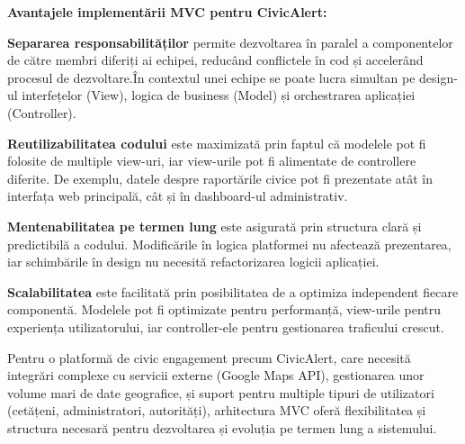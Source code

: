 \documentclass[12pt,a4paper]{report}
\begin{document}
\textbf{Avantajele implementării MVC pentru CivicAlert:}

\textbf{Separarea responsabilităților} permite dezvoltarea în paralel a componentelor de către membri diferiți ai echipei, reducând conflictele în cod și accelerând procesul de dezvoltare.În contextul unei echipe se  poate lucra simultan pe design-ul interfețelor (View), logica de business (Model) și orchestrarea aplicației (Controller).

\textbf{Reutilizabilitatea codului} este maximizată prin faptul că modelele pot fi folosite de multiple view-uri, iar view-urile pot fi alimentate de controllere diferite. De exemplu, datele despre raportările civice pot fi prezentate atât în interfața web principală, cât și în dashboard-ul administrativ.

\textbf{Mentenabilitatea pe termen lung} este asigurată prin structura clară și predictibilă a codului. Modificările în logica platformei nu afectează prezentarea, iar schimbările în design nu necesită refactorizarea logicii aplicației.

\textbf{Scalabilitatea} este facilitată prin posibilitatea de a optimiza independent fiecare componentă. Modelele pot fi optimizate pentru performanță, view-urile pentru experiența utilizatorului, iar controller-ele pentru gestionarea traficului crescut.

Pentru o platformă de civic engagement precum CivicAlert, care necesită integrări complexe cu servicii externe (Google Maps API), gestionarea unor volume mari de date geografice, și suport pentru multiple tipuri de utilizatori (cetățeni, administratori, autorități), arhitectura MVC oferă flexibilitatea și structura necesară pentru dezvoltarea și evoluția pe termen lung a sistemului.
\end{document}
